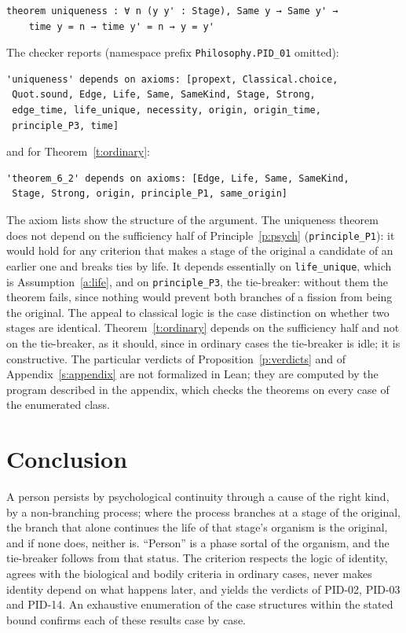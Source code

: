 \documentclass{situationist-preprint}
\begin{document}
\begin{lstlisting}
theorem uniqueness : ∀ n (y y' : Stage), Same y → Same y' →
    time y = n → time y' = n → y = y'
\end{lstlisting}

The checker reports (namespace prefix \texttt{Philosophy.PID\_01} omitted):

\begin{lstlisting}
'uniqueness' depends on axioms: [propext, Classical.choice,
 Quot.sound, Edge, Life, Same, SameKind, Stage, Strong,
 edge_time, life_unique, necessity, origin, origin_time,
 principle_P3, time]
\end{lstlisting}

\noindent and for Theorem~\ref{t:ordinary}:

\begin{lstlisting}
'theorem_6_2' depends on axioms: [Edge, Life, Same, SameKind,
 Stage, Strong, origin, principle_P1, same_origin]
\end{lstlisting}

The axiom lists show the structure of the argument. The uniqueness theorem does not depend on the sufficiency half of Principle~\ref{p:psych} (\texttt{principle\_P1}): it would hold for any criterion that makes a stage of the original a candidate of an earlier one and breaks ties by life. It depends essentially on \texttt{life\_unique}, which is Assumption~\ref{a:life}, and on \texttt{principle\_P3}, the tie-breaker: without them the theorem fails, since nothing would prevent both branches of a fission from being the original. The appeal to classical logic is the case distinction on whether two stages are identical. Theorem~\ref{t:ordinary} depends on the sufficiency half and not on the tie-breaker, as it should, since in ordinary cases the tie-breaker is idle; it is constructive. The particular verdicts of Proposition~\ref{p:verdicts} and of Appendix~\ref{s:appendix} are not formalized in Lean; they are computed by the program described in the appendix, which checks the theorems on every case of the enumerated class.

\section{Conclusion}\label{s:conclusion}

A person persists by psychological continuity through a cause of the right kind, by a non-branching process; where the process branches at a stage of the original, the branch that alone continues the life of that stage's organism is the original, and if none does, neither is. \enquote{Person} is a phase sortal of the organism, and the tie-breaker follows from that status. The criterion respects the logic of identity, agrees with the biological and bodily criteria in ordinary cases, never makes identity depend on what happens later, and yields the verdicts of PID-02, PID-03 and PID-14. An exhaustive enumeration of the \stcases{} case structures within the stated bound confirms each of these results case by case.
\end{document}
